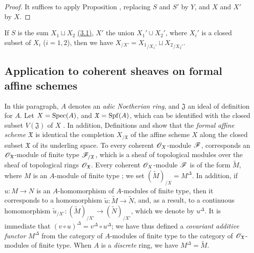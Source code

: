 \begin{proof}
It suffices to apply Proposition , replacing $S$ and $S'$ by $Y$, and $X$ and $X'$ by $X$.
\end{proof}

\begin{remark}[10.9.10]
\label{I.10.9.10}
If $S$ is the sum $X_1\sqcup X_2$ \hyperref[subsection:I.3.1]{(3.1)}, $X'$ the union $X_1'\cup X_2'$, where $X_i'$ is a closed subset of $X_i$ ($i=1,2$), then we have $X_{/X'}={X_1}_{/X_1'}\sqcup{X_2}_{/X_2'}$.
\end{remark}

\subsection{Application to coherent sheaves on formal affine schemes}
\label{subsection:I.10.10}

\begin{env}[10.10.1]
\label{I.10.10.1}
In this paragraph, $A$ denotes an \emph{adic Noetherian ring}, and $\mathfrak{J}$ an ideal of definition for $A$.
Let $X=\operatorname{Spec}(A)$, and $\mathfrak{X}=\operatorname{Spf}(A)$, which can be identified with the closed subset $V(\mathfrak{J})$ of $X$ .
In addition, Definitions  and  show that the \emph{formal affine scheme $\mathfrak{X}$} is identical the completion $X_{/\mathfrak{X}}$ of the affine scheme $X$ along the closed subset $\mathfrak{X}$ of its underling space.
To every coherent $\mathscr{O}_X$-module $\mathscr{F}$, corresponds an $\mathscr{O}_\mathfrak{X}$-module of finite type $\mathscr{F}_{/\mathfrak{X}}$, which is a sheaf of topological modules over the sheaf of topological rings $\mathscr{O}_\mathfrak{X}$.
Every coherent $\mathscr{O}_X$-module $\mathscr{F}$ is of the form $\widetilde{M}$, where $M$ is an $A$-module of finite type ; we set $(\widetilde{M})_{/X}=M^\Delta$.
In addition, if $u:M\to N$ is an $A$-homomorphism of $A$-modules of finite type, then it corresponds to a homomorphism $\widetilde{u}:\widetilde{M}\to\widetilde{N}$, and, as a result, to a continuous homomorphism $\widetilde{u}_{/X'}:(\widetilde{M})_{/X'}\to(\widetilde{N})_{/X'}$, which we denote by $u^\Delta$.
It is immediate that $(v\circ u)^\Delta=v^\Delta\circ u^\Delta$; we have thus defined a \emph{covariant additive functor $M^\Delta$} from the category of $A$-modules of finite type to the category of $\mathscr{O}_\mathfrak{X}$-modules of finite type.
When $A$ is a \emph{discrete} ring, we have $M^\Delta=\widetilde{M}$.
\end{env}


